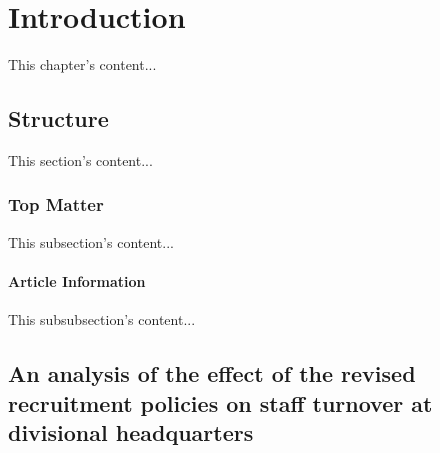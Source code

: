\documentclass{book}
\begin{document}
\chapter{Introduction}
This chapter's content...

\section{Structure}
This section's content...

\subsection{Top Matter}
This subsection's content...

\subsubsection{Article Information}
This subsubsection's content...

\section[Effect on staff turnover]{An analysis of the
effect of the revised recruitment policies on staff
turnover at divisional headquarters}
\end{document}
